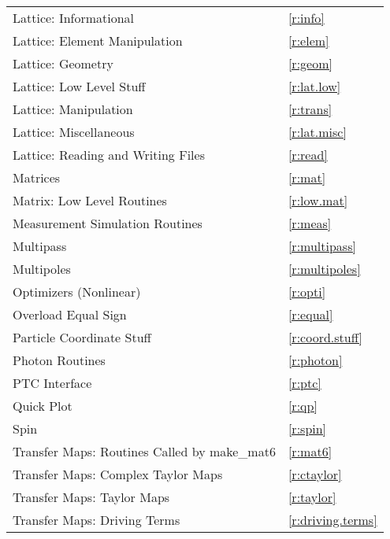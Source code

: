 \begin{center}
\begin{tabular}{ll}
  Lattice: Informational                      & \ref{r:info}           \\
  Lattice: Element Manipulation               & \ref{r:elem}           \\
  Lattice: Geometry                           & \ref{r:geom}           \\
  Lattice: Low Level Stuff                    & \ref{r:lat.low}        \\
  Lattice: Manipulation                       & \ref{r:trans}          \\
  Lattice: Miscellaneous                      & \ref{r:lat.misc}       \\
  Lattice: Reading and Writing Files          & \ref{r:read}           \\
  Matrices                                    & \ref{r:mat}            \\
  Matrix: Low Level Routines                  & \ref{r:low.mat}        \\
  Measurement Simulation Routines             & \ref{r:meas}           \\
  Multipass                                   & \ref{r:multipass}      \\
  Multipoles                                  & \ref{r:multipoles}     \\
  Optimizers (Nonlinear)                      & \ref{r:opti}           \\
  Overload Equal Sign                         & \ref{r:equal}          \\
  Particle Coordinate Stuff                   & \ref{r:coord.stuff}    \\
  Photon Routines                             & \ref{r:photon}         \\
  PTC Interface                               & \ref{r:ptc}            \\
  Quick Plot                                  & \ref{r:qp}             \\
  Spin                                        & \ref{r:spin}           \\
  Transfer Maps: Routines Called by make_mat6 & \ref{r:mat6}           \\
  Transfer Maps: Complex Taylor Maps          & \ref{r:ctaylor}        \\
  Transfer Maps: Taylor Maps                  & \ref{r:taylor}         \\
  Transfer Maps: Driving Terms                & \ref{r:driving.terms}  \\

\end{tabular}
\end{center}
